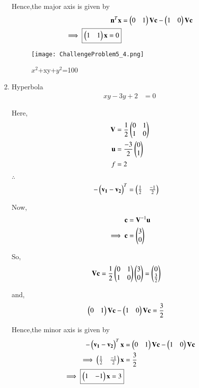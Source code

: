 \documentclass[journal,12pt,twocolumn]{IEEEtran}
\begin{document}
\begin{enumerate}
    Hence,the major axis is given by
    \begin{align}
        \mathbf{n}^T\mathbf{x} &= \begin{pmatrix}0 & 1\end{pmatrix}\mathbf{V}\mathbf{c} - \begin{pmatrix}1 & 0\end{pmatrix}\mathbf{V}\mathbf{c} 
        \\
        \implies \boxed{\begin{pmatrix}1 & 1\end{pmatrix}\mathbf{x} = 0}
    \end{align}
    
    \begin{figure}[!ht]
    \centering
    \texttt{[image: ChallengeProblem5\_4.png]}
    \caption{$x^2$+xy+$y^2$=100}
    \label{ex4}	
    \end{figure}
    
    \item Hyperbola
    \begin{align}
        xy-3y+2 &= 0
    \end{align}
    
    Here,
    \begin{align}
    \mathbf{V} &= \frac{1}{2}\begin{pmatrix}0 & 1 \\ 1 & 0\end{pmatrix} \\
    \mathbf{u} &= \frac{-3}{2}\begin{pmatrix}0 \\ 1\end{pmatrix} \\
    f &= 2
    \end{align}

    $\therefore$
    \begin{align}
    -\begin{pmatrix}\mathbf{v_1}-\mathbf{v_2}\end{pmatrix}^T &= \begin{pmatrix}\frac{1}{2} & \frac{-1}{2}\end{pmatrix}
    \end{align}

    Now,
    \begin{align}
    \mathbf{c} &= \mathbf{V}^{-1}\mathbf{u}\\
    \implies \mathbf{c} &= \begin{pmatrix}3 \\ 0\end{pmatrix}
    \end{align}

    So,
    \begin{align}
    \mathbf{V}\mathbf{c} &= \frac{1}{2}\begin{pmatrix}0 & 1 \\ 1 & 0\end{pmatrix}\begin{pmatrix}3 \\ 0\end{pmatrix}=\begin{pmatrix}0 \\ \frac{3}{2}\end{pmatrix}
    \end{align}

    and,
    \begin{align}
    \begin{pmatrix}0 & 1\end{pmatrix}\mathbf{V}\mathbf{c} - \begin{pmatrix}1&0\end{pmatrix}\mathbf{V}\mathbf{c} &= \frac{3}{2}
    \end{align}

    Hence,the minor axis is given by
    \begin{align}
    -\begin{pmatrix}\mathbf{v_1}-\mathbf{v_2}\end{pmatrix}^T\mathbf{x} &= \begin{pmatrix}0 & 1\end{pmatrix}\mathbf{V}\mathbf{c} - \begin{pmatrix}1 & 0\end{pmatrix}\mathbf{V}\mathbf{c} \\
    \implies \begin{pmatrix}\frac{1}{2} & \frac{-1}{2}\end{pmatrix}\mathbf{x} &= \frac{3}{2} \\
    \implies \boxed{\begin{pmatrix}1 & -1\end{pmatrix}\mathbf{x} = 3}
    \end{align}
    

\end{enumerate}
\end{document}
